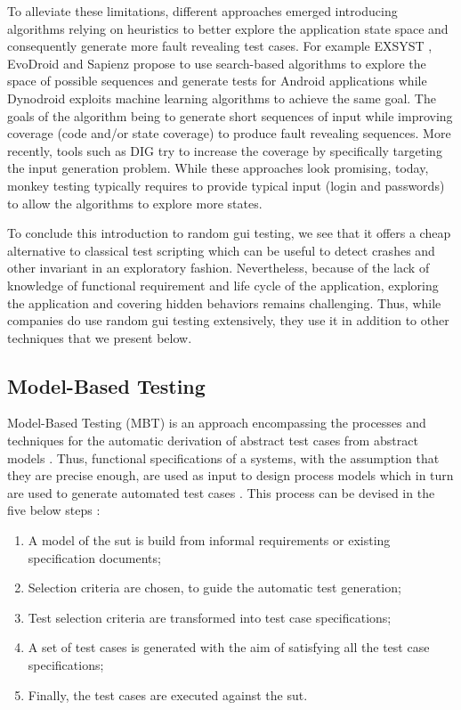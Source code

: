 To alleviate these limitations, different approaches emerged introducing algorithms relying on heuristics to better explore the application state space and consequently generate more fault revealing test cases. For example EXSYST \cite{Gross2012}, EvoDroid \cite{Mahmood2014} and Sapienz \cite{Mao2016} propose to use search-based algorithms to explore the space of possible sequences and generate tests for Android applications while Dynodroid \cite{Machiry2013} exploits machine learning algorithms to achieve the same goal. The goals of the algorithm being to generate short sequences of input while improving coverage (code \cite{Gross2012} and/or state \cite{Machiry2013} coverage) to produce fault revealing sequences. More recently, tools such as DIG \cite{Biagiola2019} try to increase the coverage by specifically targeting the input generation problem. While these approaches look promising, today, monkey testing typically requires to provide typical input (\eg login and passwords) to allow the algorithms to explore more states.

To conclude this introduction to random \gls{gui} testing, we see that it offers a cheap alternative to classical test scripting which can be useful to detect crashes and other invariant in an exploratory fashion. Nevertheless, because of the lack of knowledge of functional requirement and life cycle of the application, exploring the application and covering hidden behaviors remains challenging. Thus, while companies do use random \gls{gui} testing extensively, they use it in addition to other techniques that we present below.

\subsection{Model-Based Testing}
\label{sec:introduction-model-based-testing}

Model-Based Testing (MBT) is an approach encompassing the processes and techniques for the automatic derivation of abstract test cases from abstract models \cite{Utting2012}. Thus, functional specifications of a systems, with the assumption that they are precise enough, are used as input to design process models which in turn are used to generate automated test cases \cite{Gupta2011}. This process can be devised in the five below steps \cite{Utting2012}:

\begin{enumerate}
    \item A model of the \gls{sut} is build from informal requirements or existing specification documents;
    \item Selection criteria are chosen, to guide the automatic test generation;
    \item Test selection criteria are transformed into test case specifications;
    \item A set of test cases is generated with the aim of satisfying all the test case specifications;
    \item Finally, the test cases are executed against the \gls{sut}.
\end{enumerate}

